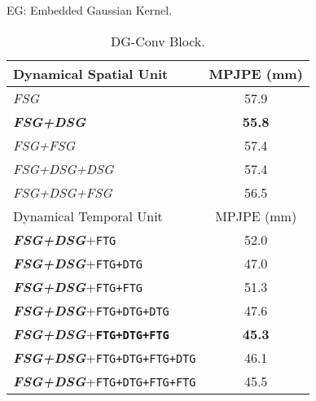 \documentclass[journal]{IEEEtran}
\begin{document}
\begin{table}[t]
\begin{center}
{EG: Embedded Gaussian Kernel.}
\label{hhhhhh}
\end{center}
\vspace{0.1cm}
\begin{center}
\begin{tabular}{l|c}
\hline\hline
Dynamical Spatial Unit                                                       & MPJPE (mm)    \\
\hline\hline
\textit{FSG}                                                                         &   57.9       \\
\textbf{\textit{FSG+DSG}}                                                    &  \textbf{55.8}        \\
\textit{FSG+FSG}                                                                  &   57.4      \\
\textit{FSG+DSG+DSG}                                                                  &   57.4       \\
\textit{FSG+DSG+FSG}                                                                 &    56.5      \\
\hline\hline
Dynamical Temporal Unit                                                      & MPJPE (mm)   \\
\hline\hline
\textbf{\textit{FSG+DSG}}+\texttt{FTG}                                                            &  52.0        \\
\textbf{\textit{FSG+DSG}}+\texttt{FTG+DTG}                                                        &     47.0     \\
\textbf{\textit{FSG+DSG}}+\texttt{FTG+FTG}                                                        &     51.3   \\
\textbf{\textit{FSG+DSG}}+\texttt{FTG+DTG+DTG}                                                    &    47.6      \\
\textbf{\textit{FSG+DSG}}+\textbf{\texttt{FTG+DTG+FTG}}                                           &  \bf{45.3}        \\
\textbf{\textit{FSG+DSG}}+\texttt{FTG+DTG+FTG+DTG}                                                &  46.1      \\
\textbf{\textit{FSG+DSG}}+\texttt{FTG+DTG+FTG+FTG}                                                &  45.5       \\
\hline\hline
\end{tabular}\caption{DG-Conv Block.}
\label{tab:dgcov}
\end{center}
\vspace{-0.7cm}
\end{table}
\end{document}
